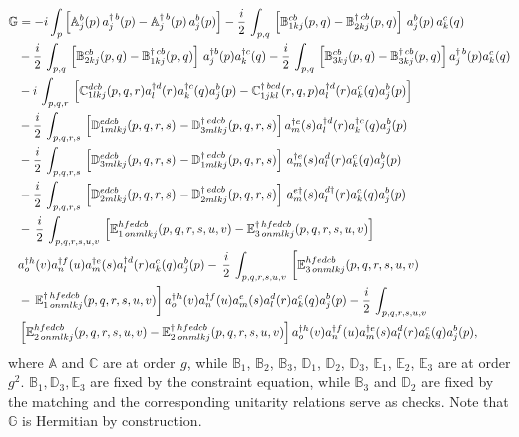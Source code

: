 \documentclass[a4paper,11pt]{article}
\def\mf#1{\mathbb{#1}}
\begin{document}
\begin{align} \label{eq:expon}
    \mf{G} & = -i\int_{p}\left[\mf{A}^{b}_{j}(p)\,a^{\dagger\, b}_{j}(p) - \mf{A}^{\dagger\, b}_{j}(p)\, a^{b}_{j}(p) \right]-\frac{i}{2}\,\int_{p,q}\, \left[\mf{B}^{cb}_{1kj}(p,q)-\mf{B}^{\dagger\, cb}_{2kj}(p,q)\right]\,a^{b}_{j}(p)\,a^{c}_{k}(q) \notag \\ & -\frac{i}{2}\,\int_{p,q}\, \left[\mf{B}^{cb}_{2kj}(p,q)  - \mf{B}^{\dagger\, cb}_{1kj}(p,q)\right]\,a^{\dagger b}_{j}(p)a^{\dagger c}_{k}(q) -\frac{i}{2}\, \int_{p,q}\,\left[\mf{B}^{cb}_{3kj}(p,q)-\mf{B}^{\dagger\,cb}_{3kj}(p,q)\right]a^{\dagger\, b}_{j}(p) a^{c}_{k}(q) \notag \\ & -i\, \int_{p,q,r}\, \left[\mf{C}^{ dcb}_{1lkj}(p,q,r) a^{\dagger d}_{l}(r)  a^{\dagger c}_{k}(q)  a^{b}_{j}(p) -\mf{C}^{\dagger\, bcd}_{1jkl}(r,q,p) a^{\dagger d}_{l}(r) a^{c}_{k}(q) a^{b}_{j}(p)\right]\notag \\ & -\frac{i}{2}\, \int_{p,q,r,s}\, \left[\mf{D}^{edcb}_{1mlkj}(p,q,r,s)-\mf{D}^{\dagger\,edcb}_{3mlkj}(p,q,r,s)\right]a^{\dagger e}_{m}(s)a^{\dagger d}_{l}(r)a^{\dagger c}_{k}(q)a^{b}_{j}(p) \notag \\ & -\frac{i}{2}\,\int_{p,q,r,s}\,\left[\mf{D}^{edcb}_{3mlkj}(p,q,r,s)-\mf{D}^{\dagger\,edcb}_{1mlkj}(p,q,r,s)  \right]\,a^{\dagger e}_{m}(s)a^{d}_{l}(r)a^{c}_{k}(q)a^{b}_{j}(p)\notag \\ & -\frac{i}{2}\, \int_{p,q,r,s}\, \left[\mf{D}^{edcb}_{2mlkj}(p,q,r,s)-\mf{D}^{\dagger\, edcb}_{2mlkj}(p,q,r,s)\right]\,a^{e\dagger}_{m}(s)a^{d\dagger}_{l}(r)a^{c}_{k}(q)a^{b}_{j}(p)\notag \\ & -\, \frac{i}{2}\,\int_{p,q,r,s,u,v}\,\left[\mf{E}^{hfedcb}_{1\,onmlkj}(p,q,r,s,u,v)-\mf{E}^{\dagger\, hfedcb}_{3\,onmlkj}(p,q,r,s,u,v)\right]\notag \\ & a^{\dagger h}_{o}(v)a^{\dagger f}_{n}(u)a^{\dagger e}_{m}(s)a^{\dagger d}_{l}(r)a^{c}_{k}(q)a^{b}_{j}(p) -\,\frac{i}{2}\,\int_{p,q,r,s,u,v}\, \bigg[\mf{E}^{hfedcb}_{3\,onmlkj}(p,q,r,s,u,v)\notag \\ & -\,\mf{E}^{\dagger\,hfedcb}_{1\,onmlkj}(p,q,r,s,u,v)\bigg]\,a^{\dagger h}_{o}(v)a^{\dagger f}_{n}(u)a^{e}_{m}(s)a^{d}_{l}(r)a^{c}_{k}(q)a^{b}_{j}(p) -\frac{i}{2}\, \int_{p,q,r,s,u,v}\,\notag \\ &  \left[\mf{E}^{hfedcb}_{2\,onmlkj}(p,q,r,s,u,v)-\mf{E}^{\dagger\, hfedcb}_{2\,onmlkj}(p,q,r,s,u,v)\right] a^{\dagger h}_{o}(v)a^{\dagger f}_{n}(u)a^{\dagger e}_{m}(s)a^{d}_{l}(r)a^{c}_{k}(q)a^{b}_{j}(p),
\end{align}
where $\mf{A}$ and $\mf{C}$ are at order $g$, while  $\mf{B}_{1}$, $\mf{B}_{2}$, $\mf{B}_{3}$, $\mf{D}_{1}$, $\mf{D}_{2}$, $\mf{D}_{3}$, $\mf{E}_{1}$, $\mf{E}_{2}$, $\mf{E}_{3}$ are at order $g^{2}$. $\mf{B}_{1}, \mf{D}_{3},\mf{E}_{3}$ are fixed by the constraint equation{\color{chg}, while $\mf{B}_{3}$ and $\mf{D}_{2}$ are fixed by the matching and the corresponding unitarity relations serve as checks}. Note that $\mf{G}$ is Hermitian by construction.
 
\end{document}
